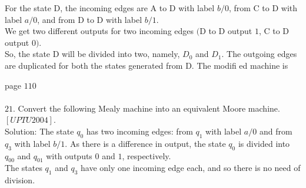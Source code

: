 \documentclass[12pt,a4paper]{book}
\begin{document}
For the state D, the incoming edges are A to D with label $b/0$, from C to D with label $a/0$, and
from D to D with label $b/1$.\\
We get two different outputs for two incoming edges $($D to D output $1$, C to D output $0)$.\\
So, the state D will be divided into two, namely, $D_0$ and $D_1$. The outgoing edges are duplicated
for both the states generated from D. The modifi ed machine is 
\begin{center}
 \end{center} \newpage
 page $110$\\\\
 $21.$ Convert the following Mealy machine into an equivalent Moore machine. $\left[UPTU 2004\right]$.\\
Solution: The state $q_0$ has two incoming edges: from $q_1$ with label $a/0$ and from $q_3$ with label $b/1$. As there is a difference in output, the state $q_0$ is divided into $q_{00}$ and $q_{01}$ with outputs $0$ and $1$, respectively.\\
The states $q_1$ and $q_3$ have only one incoming edge each, and so there is no need of division.\\
\end{document}
